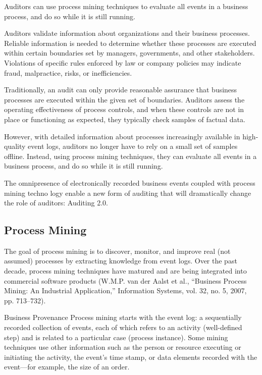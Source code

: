 Auditors can use process mining techniques to evaluate all events in a business process, and do so while it is still running.~\cite{5427384}

Auditors validate information about organizations and their business processes. Reliable information is needed to determine whether these processes are executed within certain boundaries set by managers, governments, and other stakeholders. Violations of specific rules enforced by law or company policies may indicate fraud, malpractice, risks, or inefficiencies.

Traditionally, an audit can only provide reasonable assurance that business processes are executed within the given set of boundaries. Auditors assess the operating effectiveness of process controls, and when these controls are not in place or functioning as expected, they typically check samples of factual data.

However, with detailed information about processes increasingly available in high-quality event logs, auditors no longer have to rely on a small set of samples offline. Instead, using process mining techniques, they can evaluate all events in a business process, and do so while it is still running.

The omnipresence of electronically recorded business events coupled with process mining techno logy enable a new form of auditing that will dramatically change the role of auditors: Auditing 2.0.

\subsection{Process Mining}

The goal of process mining is to discover, monitor, and improve real (not assumed) processes by extracting knowledge from event logs. Over the past decade, process mining techniques have matured and are being integrated into commercial software products (W.M.P. van der Aalst et al., “Business Process Mining: An Industrial Application,” Information Systems, vol. 32, no. 5, 2007, pp. 713–732).

Business Provenance
Process mining starts with the event log: a sequentially recorded collection of events, each of which refers to an activity (well-defined step) and is related to a particular case (process instance). Some mining techniques use other information such as the person or resource executing or initiating the activity, the event's time stamp, or data elements recorded with the event—for example, the size of an order.

